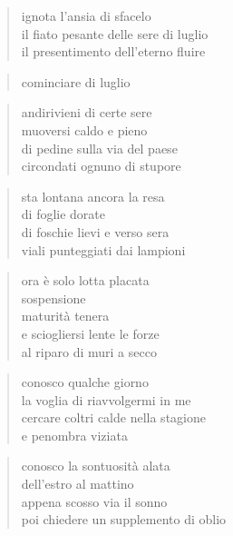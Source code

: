 \begin{verse}
    ignota l'ansia di sfacelo\\
    il fiato pesante delle sere di luglio\\
    il presentimento dell'eterno fluire
\end{verse}

\clearpage


\begin{verse}
    cominciare di luglio
\end{verse}

\begin{verse}
    andirivieni di certe sere\\
    muoversi caldo e pieno\\
    di pedine sulla via del paese\\
    circondati ognuno di stupore
\end{verse}

\begin{verse}
    sta lontana ancora la resa\\
    di foglie dorate\\
    di foschie lievi e verso sera\\
    viali punteggiati dai lampioni
\end{verse}

\begin{verse}
    ora è solo lotta placata\\
    sospensione\\
    maturità tenera\\
    e sciogliersi lente le forze\\
    al riparo di muri a secco
\end{verse}

\clearpage


\begin{verse}
    conosco qualche giorno\\
    la voglia di riavvolgermi in me\\
    cercare coltri calde nella stagione\\
    e penombra viziata
\end{verse}

\begin{verse}
    conosco la sontuosità alata\\
    dell'estro al mattino\\
    appena scosso via il sonno\\
    poi chiedere un supplemento di oblio
\end{verse}

